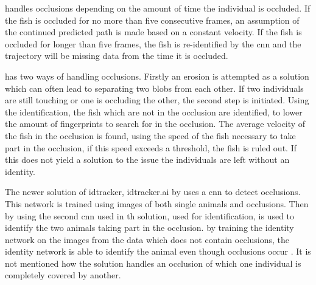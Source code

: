\cite{Wang2017} handles occlusions depending on the amount of time the individual is occluded. If the fish is occluded for no more than five consecutive frames, an assumption of the continued predicted path is made based on a constant velocity. If the fish is occluded for longer than five frames, the fish is re-identified by the \gls{cnn} and the trajectory will be missing data from the time it is occluded.

\cite{idtracker2014} has two ways of handling occlusions. Firstly an erosion is attempted as a solution which can often lead to separating two \gls{blob}s from each other. If two individuals are still touching or one is occluding the other, the second step is initiated. Using the identification, the fish which are not in the occlusion are identified, to lower the amount of fingerprints to search for in the occlusion. The average velocity of the fish in the occlusion is found, using the speed of the fish necessary to take part in the occlusion,  if this speed exceeds a threshold, the fish is ruled out. If this does not yield a solution to the issue the individuals are left without an identity.

The newer solution of idtracker, idtracker.ai by \cite{Romero-Ferrero2019} uses a \gls{cnn} to detect occlusions. This network is trained using images of both single animals and occlusions. Then by using the second \gls{cnn} used in th solution, used for identification, is used to identify the two animals taking part in the occlusion. by training the identity network on the images from the data which does not contain occlusions, the identity network is able to identify the animal even though occlusions occur \citep{Romero-Ferrero2019}. It is not mentioned how the solution handles an occlusion of which one individual is completely covered by another.

